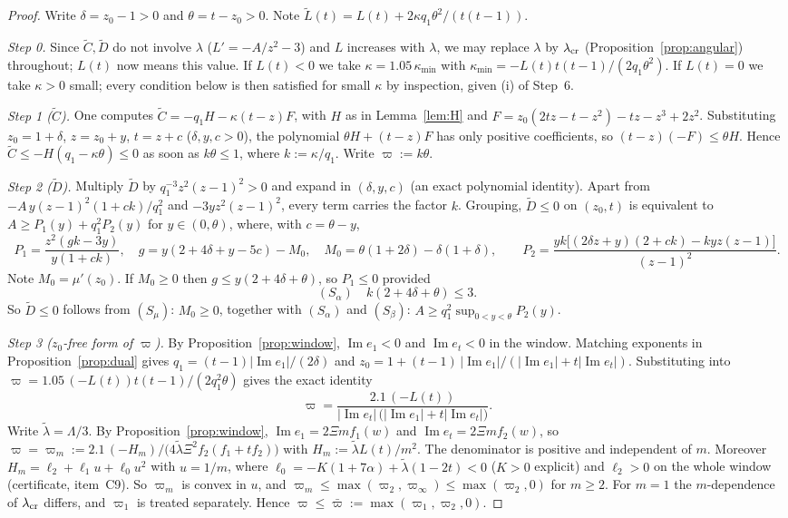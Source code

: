 \documentclass[11pt]{amsart}
\theoremstyle{definition}
\theoremstyle{remark}
\numberwithin{equation}{section}
\renewcommand{\Im}{\operatorname{Im}}
\begin{document}
\begin{proof}
Write $\delta=z_0-1>0$ and $\theta=t-z_0>0$. Note $\tilde L(t)=L(t)+2\kappa q_1\theta^2/(t(t-1))$.

\emph{Step 0.} Since $\tilde C,\tilde D$ do not involve $\lambda$ ($L'=-A/z^2-3$) and $L$ increases with $\lambda$, we may
replace $\lambda$ by $\lambda_{\rm cr}$ (Proposition~\ref{prop:angular}) throughout; $L(t)$ now means this value. If $L(t)<0$ we take $\kappa=1.05\,\kappa_{\min}$ with $\kappa_{\min}=-L(t)t(t-1)/(2q_1\theta^2)$. If
$L(t)=0$ we take $\kappa>0$ small; every condition below is then satisfied for small $\kappa$ by inspection, given
(i) of Step~6.

\emph{Step 1 ($\tilde C$).} One computes $\tilde C=-q_1H-\kappa(t-z)F$, with $H$ as in Lemma~\ref{lem:H} and
$F=z_0(2tz-t-z^2)-tz-z^3+2z^2$. Substituting $z_0=1+\delta$, $z=z_0+y$, $t=z+c$ ($\delta,y,c>0$), the polynomial
$\theta H+(t-z)F$ has only positive coefficients, so $(t-z)(-F)\le\theta H$. Hence
$\tilde C\le-H(q_1-\kappa\theta)\le0$ as soon as $k\theta\le1$, where $k:=\kappa/q_1$. Write $\varpi:=k\theta$.

\emph{Step 2 ($\tilde D$).} Multiply $\tilde D$ by $q_1^{-3}z^2(z-1)^2>0$ and expand in $(\delta,y,c)$ (an exact polynomial
identity). Apart from $-A\,y(z-1)^2(1+ck)/q_1^2$ and $-3yz^2(z-1)^2$, every term carries the factor $k$. Grouping, $\tilde D\le0$
on $(z_0,t)$ is equivalent to $A\ge P_1(y)+q_1^2P_2(y)$ for $y\in(0,\theta)$, where, with $c=\theta-y$,
\[
P_1=\frac{z^2(g k-3y)}{y(1+ck)},\quad g=y(2+4\delta+y-5c)-M_0,\quad M_0=\theta(1+2\delta)-\delta(1+\delta),\qquad
P_2=\frac{yk\big[(2\delta z+y)(2+ck)-kyz(z-1)\big]}{(z-1)^2}.
\]
Note $M_0=\mu'(z_0)$. If $M_0\ge0$ then $g\le y(2+4\delta+\theta)$, so $P_1\le0$ provided
\[
(S_\alpha)\quad k(2+4\delta+\theta)\le3 .
\]
So $\tilde D\le0$ follows from $(S_\mu)$: $M_0\ge0$, together with $(S_\alpha)$ and $(S_\beta)$: $A\ge q_1^2\sup_{0<y<\theta}P_2(y)$.

\emph{Step 3 ($z_0$-free form of $\varpi$).} By Proposition~\ref{prop:window}, $\Im e_1<0$ and $\Im e_t<0$ in the window.
Matching exponents in Proposition~\ref{prop:dual} gives $q_1=(t-1)|\Im e_1|/(2\delta)$ and
$z_0=1+(t-1)\,|\Im e_1|/(|\Im e_1|+t|\Im e_t|)$. Substituting into $\varpi=1.05\,(-L(t))t(t-1)/(2q_1^2\theta)$ gives the
exact identity
\[
\varpi=\frac{2.1\,(-L(t))}{|\Im e_t|\,\big(|\Im e_1|+t|\Im e_t|\big)} .
\]
Write $\tilde\lambda=\Lambda/3$. By Proposition~\ref{prop:window}, $\Im e_1=2\Xi mf_1(w)$ and $\Im e_t=2\Xi mf_2(w)$, so
$\varpi=\varpi_m:=2.1\,(-H_m)/\big(4\tilde\lambda\Xi^2f_2(f_1+tf_2)\big)$ with $H_m:=\tilde\lambda L(t)/m^2$.
The denominator is positive and independent of $m$. Moreover $H_m=\ell_2+\ell_1u+\ell_0u^2$ with $u=1/m$, where
$\ell_0=-K(1+7\alpha)+\tilde\lambda(1-2t)<0$ ($K>0$ explicit) and $\ell_2>0$ on the whole window (certificate, item~C9).
So $\varpi_m$ is convex in $u$, and $\varpi_m\le\max(\varpi_2,\varpi_\infty)\le\max(\varpi_2,0)$ for $m\ge2$. For $m=1$ the
$m$-dependence of $\lambda_{\rm cr}$ differs, and $\varpi_1$ is treated separately. Hence $\varpi\le\bar\varpi:=\max(\varpi_1,\varpi_2,0)$.


\end{proof}
\end{document}
